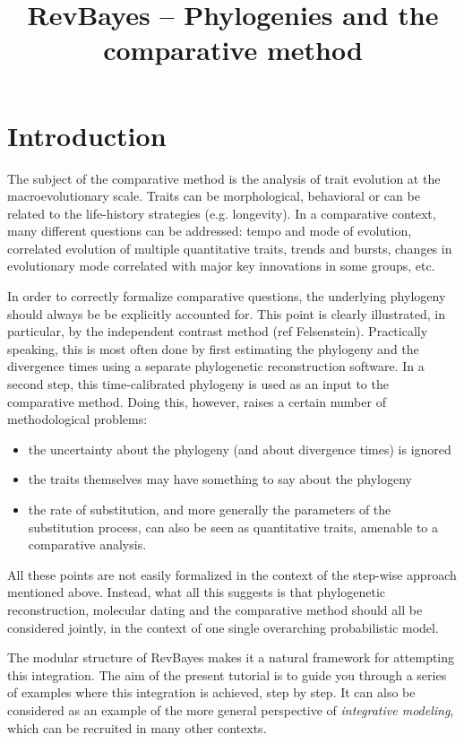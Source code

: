 \documentclass[usletter]{article}
\title{RevBayes -- Phylogenies and the comparative method}
\begin{document}
\maketitle

\section*{Introduction}

The subject of the comparative method is the analysis of trait evolution at the macroevolutionary scale.
Traits can be morphological, behavioral or can be related to the life-history strategies (e.g. longevity).
In a comparative context, many different questions can be addressed: tempo and mode of evolution, correlated evolution of multiple quantitative traits, trends and bursts, changes in evolutionary mode correlated with major key innovations in some groups, etc.

In order to correctly formalize comparative questions, the underlying phylogeny should always be be explicitly accounted for. This point is clearly illustrated, in particular, by the independent contrast method (ref Felsenstein). Practically speaking, this is most often done by first estimating the phylogeny and the divergence times using a separate phylogenetic reconstruction software. In a second step, this time-calibrated phylogeny is used as an input to the comparative method.
Doing this, however, raises a certain number of methodological problems:
\begin{itemize}
\item
the uncertainty about the phylogeny (and about divergence times) is ignored
\item
the traits themselves may have something to say about the phylogeny
\item
the rate of substitution, and more generally the parameters of the substitution process, can also be seen as quantitative traits, amenable to a comparative analysis.
\end{itemize}
All these points are not easily formalized in the context of the step-wise approach mentioned above.
Instead, what all this suggests is that phylogenetic reconstruction, molecular dating and the comparative method should all be considered jointly, in the context of one single overarching probabilistic model.

The modular structure of RevBayes makes it a natural framework for attempting this integration.
The aim of the present tutorial is to guide you through a series of examples where this integration is achieved, step by step.
It can also be considered as an example of the more general perspective of \emph{integrative modeling}, which can be recruited in many other contexts.
\end{document}
